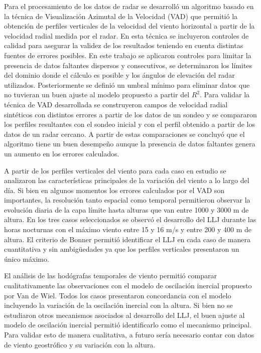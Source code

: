 \documentclass[12pt,spanish,oneside, a4paper]{book}
\begin{document}
Para el procesamiento de los datos de radar se desarrolló un algoritmo
basado en la técnica de Visualización Azimutal de la Velocidad (VAD) que
permitió la obtención de perfiles verticales de la velocidad del viento
horizontal a partir de la velocidad radial medida por el radar. En esta
técnica se incluyeron controles de calidad para asegurar la validez de
los resultados teniendo en cuenta distintas fuentes de errores posibles.
En este trabajo se aplicaron controles para limitar la presencia de
datos faltantes dispersos y consecutivos, se determinaron los límites
del dominio donde el cálculo es posible y los ángulos de elevación del
radar utilizados. Posteriormente se definió un umbral mínimo para
eliminar datos que no tuvieran un buen ajuste al modelo propuesto a
partir del \(R^2\). Para validar la técnica de VAD desarrollada se
construyeron campos de velocidad radial sintéticos con distintos errores
a partir de los datos de un sondeo y se compararon los perfiles
resultantes con el sondeo inicial y con el perfil obtenido a partir de
los datos de un radar cercano. A partir de estas comparaciones se
concluyó que el algoritmo tiene un buen desempeño aunque la presencia de
datos faltantes genera un aumento en los errores calculados.

A partir de los perfiles verticales del viento para cada caso en estudio
se analizaron las características principales de la variación del viento
a lo largo del día. Si bien en algunos momentos los errores calculados
por el VAD son importantes, la resolución tanto espacial como temporal
permitieron observar la evolución diaria de la capa límite hasta alturas
que van entre 1000 y 3000 m de altura. En los tres casos seleccionados
se observó el desarrollo del LLJ durante las horas nocturnas con el
máximo viento entre 15 y 16 m/s y entre 200 y 400 m de altura. El
criterio de Bonner permitió identificar el LLJ en cada caso de manera
cuantitativa y sin ambigüedades ya que los perfiles verticales
presentaron un único máximo.

El análisis de las hodógrafas temporales de viento permitió comparar
cualitativamente las observaciones con el modelo de oscilación inercial
propuesto por Van de Wiel. Todos los casos presentaron concordancia con
el modelo incluyendo la variación de la oscilación inercial con la
altura. Si bien no se estudiaron otros mecanismos asociados al
desarrollo del LLJ, el buen ajuste al modelo de oscilación inercial
permitió identificarlo como el mecanismo principal. Para validar esto de
manera cualitativa, a futuro sería necesario contar con datos de viento
geostrófico y su variación con la altura.
\end{document}
